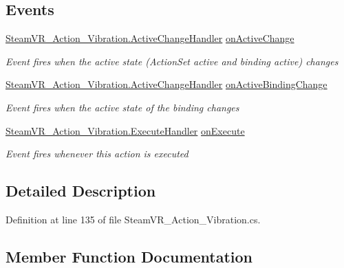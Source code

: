 \subsection*{Events}
\begin{DoxyCompactItemize}
\item 
\mbox{\hyperlink{class_valve_1_1_v_r_1_1_steam_v_r___action___vibration_a7706b3c9b71de3bea16a3fab8a882f0b}{Steam\+V\+R\+\_\+\+Action\+\_\+\+Vibration.\+Active\+Change\+Handler}} \mbox{\hyperlink{class_valve_1_1_v_r_1_1_steam_v_r___action___vibration___source_a231dc12e70ed1fae1efb7b3ae18332e3}{on\+Active\+Change}}
\begin{DoxyCompactList}\small\item\em Event fires when the active state (Action\+Set active and binding active) changes \end{DoxyCompactList}\item 
\mbox{\hyperlink{class_valve_1_1_v_r_1_1_steam_v_r___action___vibration_a7706b3c9b71de3bea16a3fab8a882f0b}{Steam\+V\+R\+\_\+\+Action\+\_\+\+Vibration.\+Active\+Change\+Handler}} \mbox{\hyperlink{class_valve_1_1_v_r_1_1_steam_v_r___action___vibration___source_a5c652e9aaf0ceb77d49e033bae6ed6bb}{on\+Active\+Binding\+Change}}
\begin{DoxyCompactList}\small\item\em Event fires when the active state of the binding changes \end{DoxyCompactList}\item 
\mbox{\hyperlink{class_valve_1_1_v_r_1_1_steam_v_r___action___vibration_ac075e9e8f3e9eea89be32c403e6f86d5}{Steam\+V\+R\+\_\+\+Action\+\_\+\+Vibration.\+Execute\+Handler}} \mbox{\hyperlink{class_valve_1_1_v_r_1_1_steam_v_r___action___vibration___source_a926343ccb67835caf49722a792e2b49b}{on\+Execute}}
\begin{DoxyCompactList}\small\item\em Event fires whenever this action is executed \end{DoxyCompactList}\end{DoxyCompactItemize}


\subsection{Detailed Description}


Definition at line 135 of file Steam\+V\+R\+\_\+\+Action\+\_\+\+Vibration.\+cs.



\subsection{Member Function Documentation}
\mbox{\label{class_valve_1_1_v_r_1_1_steam_v_r___action___vibration___source_a657db1c2eaf70175fb41b3f28d215edb}} 

